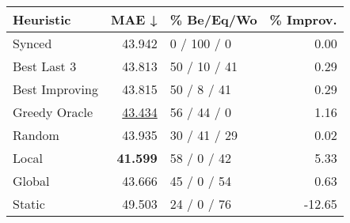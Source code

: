 \begin{tabular}{lrlr}
\toprule
\textbf{Heuristic} & \textbf{MAE ↓} & \textbf{\% Be/Eq/Wo} & \textbf{\% Improv.} \\
\midrule
            Synced &         43.942 &          0 / 100 / 0 &                0.00 \\
\midrule
       Best Last 3 &         43.813 &         50 / 10 / 41 &                0.29 \\
    Best Improving &         43.815 &          50 / 8 / 41 &                0.29 \\
\addlinespace
     Greedy Oracle &         \underline{43.434} &          56 / 44 / 0 &                1.16 \\
            Random &         43.935 &         30 / 41 / 29 &                0.02 \\
\midrule
             Local &         \textbf{41.599} &          58 / 0 / 42 &                5.33 \\
            Global &         43.666 &          45 / 0 / 54 &                0.63 \\
\midrule
            Static &         49.503 &          24 / 0 / 76 &              -12.65 \\
\bottomrule
\end{tabular}

\label{tab:non_lr01_le2_bs2_Summary}
